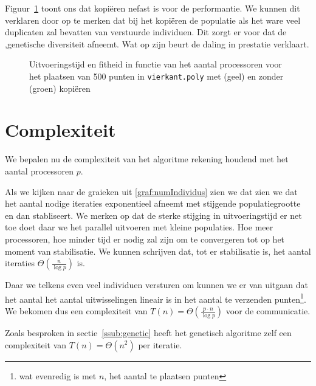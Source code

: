 Figuur~\ref{graf:nocopycopy} toont ons dat kopiëren nefast is voor de performantie.
We kunnen dit verklaren door op te merken dat bij het kopiëren de populatie als het ware veel duplicaten zal bevatten van verstuurde individuen. Dit zorgt er voor dat de ,genetische diversiteit afneemt. Wat op zijn beurt de daling in prestatie verklaart.

\begin{figure}[H]

\caption{Uitvoeringstijd en fitheid in functie van het aantal processoren voor het plaatsen van 500 punten in \texttt{vierkant.poly} met (geel) en zonder (groen) kopiëren}
\label{graf:nocopycopy}
\end{figure}

\section{Complexiteit}
\label{sub:parrcomplex}
We bepalen nu de complexiteit van het algoritme rekening houdend met het aantal processoren $p$.


Als we kijken naar de graieken uit \ref{graf:numIndividus} zien we dat zien we dat het aantal nodige iteraties exponentieel afneemt met stijgende populatiegrootte en dan stabliseert. We merken op dat de sterke stijging in uitvoeringstijd er net toe doet daar we het parallel uitvoeren met kleine populaties. Hoe meer processoren, hoe minder tijd er nodig zal zijn om te convergeren tot op het moment van stabilisatie. We kunnen schrijven dat, tot er stabilisatie is, het aantal iteraties $\Theta\left(\frac{n}{\log{p}}\right)$ is.

Daar we telkens even veel individuen versturen om kunnen we er van uitgaan dat het aantal het aantal uitwisselingen lineair is in het aantal te verzenden punten\footnote{wat evenredig is met $n$, het aantal te plaatsen punten}. We bekomen dus een complexiteit van $T(n)=\Theta\left(\frac{p\cdot n}{\log{p}}\right)$ voor de communicatie. 


Zoals besproken in sectie~\ref{ssub:genetic} heeft het genetisch algoritme zelf een complexiteit van $T(n)=\Theta(n^2)$ per iteratie. 

